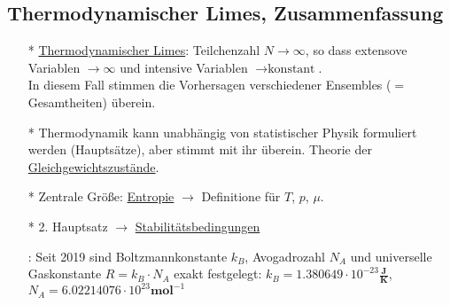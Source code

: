\subsection{Thermodynamischer Limes, Zusammenfassung}
\begin{itemize}[align=left]
  \item[* \uline{Thermodynamischer Limes}:] Teilchenzahl $N\to\infty$, so dass extensove Variablen $\to\infty$ und intensive Variablen $\to\text{konstant}$.\\
  In diesem Fall stimmen die Vorhersagen verschiedener Ensembles ($=$ Gesamtheiten) überein.
  \item[*] Thermodynamik kann unabhängig von statistischer Physik formuliert werden (Hauptsätze), aber stimmt mit ihr überein. Theorie der \uline{Gleichgewichtszustände}.
  \item[*] Zentrale Größe: \uline{Entropie} $\rightarrow$ Definitione für $T$, $p$, $\mu$.
  \item[*] 2. Hauptsatz $\rightarrow$ \uline{Stabilitätsbedingungen}
  \item[\uwave{Nachtrag}:] Seit 2019 sind Boltzmannkonstante $k_B$, Avogadrozahl $N_A$ und universelle Gaskonstante $R = k_B \cdot N_A$ exakt festgelegt: $k_B = 1.380649\cdot 10^{-23}\frac{\textbf{J}}{\textbf{K}}$, $N_A = 6.02214076\cdot 10^{23} \textbf{mol}^{-1}$
\end{itemize}
